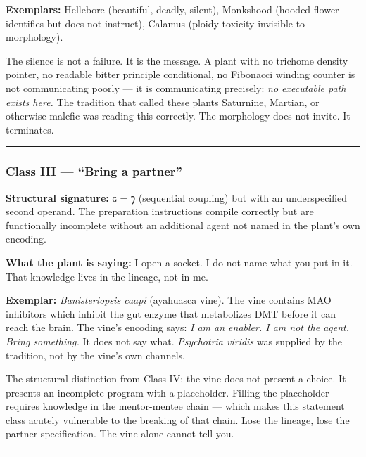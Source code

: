 \textbf{Exemplars:} Hellebore (beautiful, deadly, silent), Monkshood
(hooded flower identifies but does not instruct), Calamus
(ploidy-toxicity invisible to morphology).

The silence is not a failure. It is the message. A plant with no
trichome density pointer, no readable bitter principle conditional, no
Fibonacci winding counter is not communicating poorly --- it is
communicating precisely: \emph{no executable path exists here.} The
tradition that called these plants Saturnine, Martian, or otherwise
malefic was reading this correctly. The morphology does not invite. It
terminates.

\begin{center}\rule{0.5\linewidth}{0.5pt}\end{center}

\hypertarget{class-iii-bring-a-partner}{%
\subsubsection{Class III --- ``Bring a
partner''}\label{class-iii-bring-a-partner}}

\textbf{Structural signature:} ɢ = 𐑠 (sequential coupling) but with an
underspecified second operand. The preparation instructions compile
correctly but are functionally incomplete without an additional agent
not named in the plant's own encoding.

\textbf{What the plant is saying:} I open a socket. I do not name what
you put in it. That knowledge lives in the lineage, not in me.

\textbf{Exemplar:} \emph{Banisteriopsis caapi} (ayahuasca vine). The
vine contains MAO inhibitors which inhibit the gut enzyme that
metabolizes DMT before it can reach the brain. The vine's encoding says:
\emph{I am an enabler. I am not the agent. Bring something.} It does not
say what. \emph{Psychotria viridis} was supplied by the tradition, not
by the vine's own channels.

The structural distinction from Class IV: the vine does not present a
choice. It presents an incomplete program with a placeholder. Filling
the placeholder requires knowledge in the mentor-mentee chain --- which
makes this statement class acutely vulnerable to the breaking of that
chain. Lose the lineage, lose the partner specification. The vine alone
cannot tell you.

\begin{center}\rule{0.5\linewidth}{0.5pt}\end{center}

